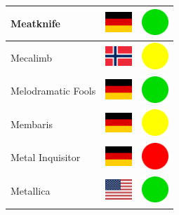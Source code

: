 \documentclass[12pt, a4paper, twoside]{report}
\begin{document}
\begin{center}
\begin{longtable}{|p{5cm}|p{2cm}|p{2cm}|}
Meatknife & \includegraphics[width=1cm]{4x3/de} & \includegraphics[width=1cm]{likes/y} \\ \hline
Mecalimb & \includegraphics[width=1cm]{4x3/no} & \includegraphics[width=1cm]{likes/m} \\ \hline
Melodramatic Fools & \includegraphics[width=1cm]{4x3/de} & \includegraphics[width=1cm]{likes/y} \\ \hline
Membaris & \includegraphics[width=1cm]{4x3/de} & \includegraphics[width=1cm]{likes/m} \\ \hline
Metal Inquisitor & \includegraphics[width=1cm]{4x3/de} & \includegraphics[width=1cm]{likes/n} \\ \hline
Metallica & \includegraphics[width=1cm]{4x3/us} & \includegraphics[width=1cm]{likes/y} \\ \hline

\end{longtable}
\end{center}
\end{document}

